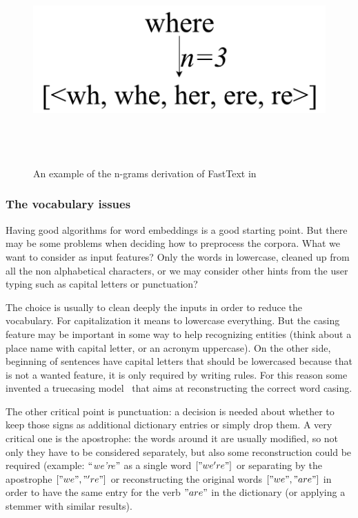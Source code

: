 \begin{figure}[!htbp]
    \centering
    \includegraphics[max width=\linewidth,max height=8cm,keepaspectratio]{figures/fastText}
    \caption{An example of the n-grams derivation of FastText in~\cite{bojanowski2016enriching}}\label{fig:fastText}
\end{figure}

\subsubsection{The vocabulary issues}
\label{soaVocabulary}

Having good algorithms for word embeddings is a good starting point. But there may be some problems when deciding how to preprocess the corpora. What we want to consider as input features? Only the words in lowercase, cleaned up from all the non alphabetical characters, or we may consider other hints from the user typing such as capital letters or punctuation?

The choice is usually to clean deeply the inputs in order to reduce the vocabulary. For capitalization it means to lowercase everything. But the casing feature may be important in some way to help recognizing entities (think about a place name with capital letter, or an acronym uppercase). On the other side, beginning of sentences have capital letters that should be lowercased because that is not a wanted feature, it is only required by writing rules. For this reason some invented a truecasing model~\cite{lita2003truecasing} that aims at reconstructing the correct word casing.

The other critical point is punctuation: a decision is needed about whether to keep those signs as additional dictionary entries or simply drop them. A very critical one is the apostrophe: the words around it are usually modified, so not only they have to be considered separately, but also some reconstruction could be required (example: $``$\textit{we're}$"$  as a single word  \(  \left[ "we're" \right]  \)  or separating by the apostrophe  \(  \left[ "we", "'re" \right]  \)  or reconstructing the original words  \(  \left[ "we", "are" \right]  \)  in order to have the same entry for the verb  \( "are" \)  in the dictionary (or applying a stemmer with similar results).

